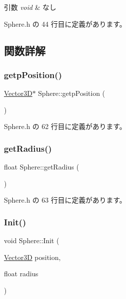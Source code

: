 \begin{DoxyParams}{引数}
{\em void} & なし \\
\hline
\end{DoxyParams}


 Sphere.\+h の 44 行目に定義があります。



\subsection{関数詳解}
\mbox{\label{class_sphere_a9fd8492659b335541af8a2f56f14e1b1}} 
\subsubsection{\texorpdfstring{getp\+Position()}{getpPosition()}}
{\footnotesize\ttfamily \mbox{\hyperlink{class_vector3_d}{Vector3D}}$\ast$ Sphere\+::getp\+Position (\begin{DoxyParamCaption}{ }\end{DoxyParamCaption})\hspace{0.3cm}{\ttfamily [inline]}}



 Sphere.\+h の 62 行目に定義があります。

\mbox{\label{class_sphere_a330dd34c7c7b6dfff106c4c71ec80028}} 
\subsubsection{\texorpdfstring{get\+Radius()}{getRadius()}}
{\footnotesize\ttfamily float Sphere\+::get\+Radius (\begin{DoxyParamCaption}{ }\end{DoxyParamCaption})\hspace{0.3cm}{\ttfamily [inline]}}



 Sphere.\+h の 63 行目に定義があります。

\mbox{\label{class_sphere_aa0c93894c5dad170bd65f1cec3493c37}} 
\subsubsection{\texorpdfstring{Init()}{Init()}}
{\footnotesize\ttfamily void Sphere\+::\+Init (\begin{DoxyParamCaption}\item[{\mbox{\hyperlink{class_vector3_d}{Vector3D}}}]{position,  }\item[{float}]{radius }\end{DoxyParamCaption})\hspace{0.3cm}{\ttfamily [inline]}}




